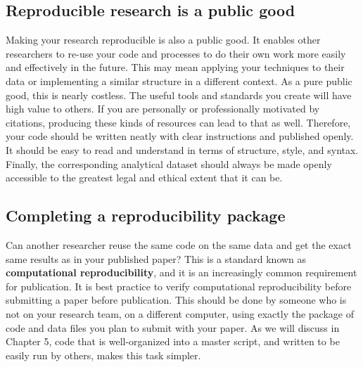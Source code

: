 \subsection{Reproducible research is a public good}

Making your research reproducible is also a public good.
It enables other researchers to re-use your code and processes
to do their own work more easily and effectively in the future.
This may mean applying your techniques to their data
or implementing a similar structure in a different context.
As a pure public good, this is nearly costless.
The useful tools and standards you create will have high value to others.
If you are personally or professionally motivated by citations,
producing these kinds of resources can lead to that as well.
Therefore, your code should be written neatly with clear instructions and published openly.
It should be easy to read and understand in terms of structure, style, and syntax.
Finally, the corresponding analytical dataset should always be made openly accessible
to the greatest legal and ethical extent that it can be.

\subsection{Completing a reproducibility package}
Can another researcher reuse the same code on the same data
and get the exact same results as in your published paper?
This is a standard known as \textbf{computational reproducibility},
and it is an increasingly common requirement for publication.
It is best practice to verify computational reproducibility before submitting a paper before publication.
This should be done by someone who is not on your research team, on a different computer,
using exactly the package of code and data files you plan to submit with your paper.
As we will discuss in Chapter 5,
code that is well-organized into a master script, and written to be easily run by others,
makes this task simpler.

